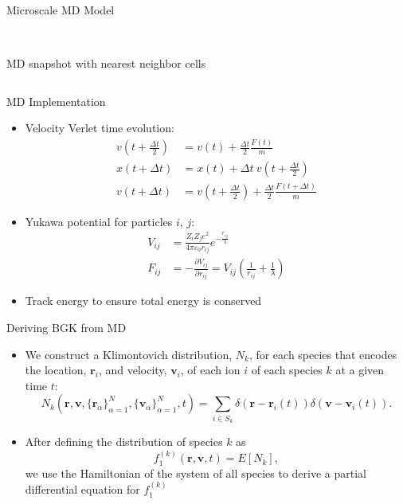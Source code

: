 \documentclass{beamer}
\begin{document}
\begin{frame}[t]{Microscale MD Model}
\begin{itemize}
\begin{columns}
\begin{column}{0.4\textwidth}
\begin{center}
						\\\tiny MD snapshot with nearest neighbor cells
					\end{center}
				\end{column}
			\end{columns}
		\end{itemize}
	\end{frame}
	
	\begin{frame}{MD Implementation}
		\begin{itemize}
			\item  Velocity Verlet time evolution:\vspace{-0.2em}
			\small\begin{align*}
			v\left(t+\frac{\Delta t}{2}\right) &= v(t) + \frac{\Delta t}{2}\frac{F(t)}{m} \\
			x(t+\Delta t) &= x(t) + \Delta t\:v\left(t+\frac{\Delta t}{2}\right) \\
			v(t+\Delta t) &= v\left(t+\frac{\Delta t}{2}\right) + \frac{\Delta t}{2}\frac{F(t+\Delta t)}{m}
			\end{align*}\normalsize
			\item  Yukawa potential for particles $i$, $j$:\vspace{-0.2em}
			\small\begin{align*}
			V_{ij} &= \frac{Z_iZ_je^2}{4\pi\varepsilon_0r_{ij}}e^{-\frac{r_{ij}}{\lambda}} \\
			F_{ij} &= -\frac{\partial V_{ij}}{\partial r_{ij}} = V_{ij}\left(\frac{1}{r_{ij}}+\frac{1}{\lambda}\right)
			\end{align*}\normalsize
			\item  Track energy to ensure total energy is conserved
		\end{itemize}
	\let\thefootnote\relax{}
	\end{frame}
	
	\begin{frame}{Deriving BGK from MD}
		\begin{itemize}
			\item  We construct a Klimontovich distribution, $N_k$, for each species that encodes the location, $\mathbf{r}_i$, and velocity, $\mathbf{v}_i$, of each ion $i$ of each species $k$ at a given time $t$:
			\begin{equation*}
				N_k(\mathbf{r},\mathbf{v},\{\mathbf{r}_\alpha\}_{\alpha=1}^{N},\{\mathbf{v}_\alpha\}_{\alpha=1}^{N},t) = \sum_{i\in S_k}\delta\left(\mathbf{r}-\mathbf{r}_i(t)\right)\delta\left(\mathbf{v}-\mathbf{v}_i(t)\right).
			\end{equation*}
			\item After defining the distribution of species $k$ as 
			\[f_1^{(k)}(\mathbf{r},\mathbf{v},t)=E[N_k],\]
			we use the Hamiltonian of the system of all species to derive a partial differential equation for $f_1^{(k)}$
		\end{itemize}
	\end{frame}
	
\end{document}
